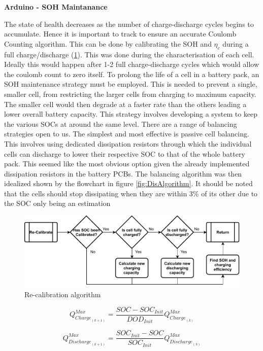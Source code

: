\documentclass[10pt,twoside]{article}
\begin{document}
\textbf{Arduino - SOH Maintanance}

The state of health decreases as the number of charge-discharge cycles begins to accumulate. Hence it is important to track to ensure an accurate Coulomb Counting algorithm. This can be done by calibrating the SOH and $\eta_c$ during a full charge/discharge (\ref{fig:RecalibrationAlgorithm}). This was done during the characterisation of each cell. Ideally this would happen after 1-2 full charge-discharge cycles which would allow the coulomb count to zero itself. To prolong the life of a cell in a battery pack, an SOH maintenance strategy must be employed. This is needed to prevent a single, smaller cell, from restricting the larger cells from charging to maximum capacity. The smaller cell would then degrade at a faster rate than the others leading a lower overall battery capacity. This strategy involves developing a system to keep the various SOCs at around the same level. There are a range of balancing strategies open to us. The simplest and most effective is passive cell balancing. This involves using dedicated dissipation resistors through which the individual cells can discharge to lower their respective SOC to that of the whole battery pack. This seemed like the most obvious option given the already implemented dissipation resistors in the battery PCBs. The balancing algorithm was then idealized shown by the flowchart in figure \ref{fig:DisAlgorithm}. It should be noted that the cells should stop dissipating when they are within 3\% of its other due to the SOC only being an estimation

\begin{figure}[hbt]
    \centering
    \includegraphics[scale = 0.7]{Recalibration (1).pdf}
    \caption{Re-calibration algorithm}
    \label{fig:RecalibrationAlgorithm}
\end{figure}

\noindent\begin{minipage}{.49\linewidth}
\begin{equation}
    Q^{Max}_{{Charge}_{(k+1)}} = \frac{SOC - SOC_{Init}}{DOD_{Init}}Q^{Max}_{{Charge}_{(k)}}
    \label{equ:NewChargingCap}
\end{equation}
\end{minipage}
\begin{minipage}{.49\linewidth}
\begin{equation}
    Q^{Max}_{{Discharge}_{(k+1)}} = \frac{SOC_{Init} - SOC}{SOC_{Init}}Q^{Max}_{{Discharge}_{(k)}}
    \label{equ:NewDischargingCap}
\end{equation}
\end{minipage}
\end{document}
